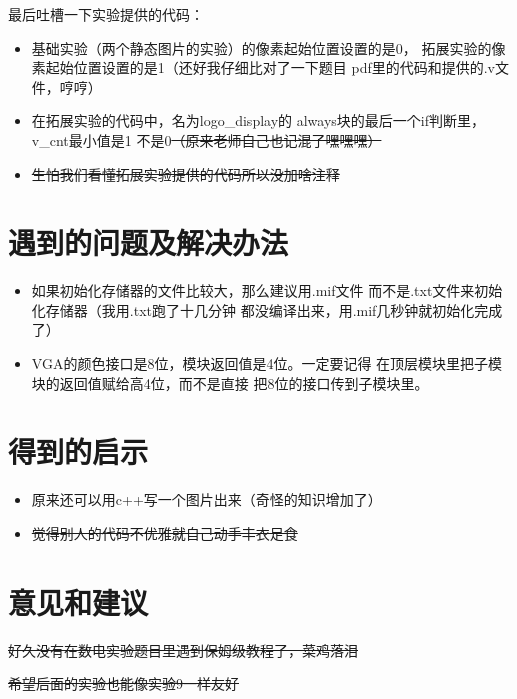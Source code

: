 \documentclass[12pt,a4paper,UTF8]{article}
\begin{document}
最后吐槽一下实验提供的代码：
\begin{itemize}
  \item 基础实验（两个静态图片的实验）的像素起始位置设置的是0，
        拓展实验的像素起始位置设置的是1（还好我仔细比对了一下题目
        pdf里的代码和提供的.v文件，哼哼）
  \item 在拓展实验的代码中，名为\mbox{logo\_display}的
        always块的最后一个if判断里，\mbox{v\_cnt}最小值是1
        不是0\sout{（原来老师自己也记混了嘿嘿嘿）}
  \item \sout{生怕我们看懂拓展实验提供的代码所以没加啥注释}
\end{itemize}


\section{遇到的问题及解决办法}
\begin{itemize}
  \item 如果初始化存储器的文件比较大，那么建议用.mif文件
        而不是.txt文件来初始化存储器（我用.txt跑了十几分钟
        都没编译出来，用.mif几秒钟就初始化完成了）
  \item VGA的颜色接口是8位，模块返回值是4位。一定要记得
        在顶层模块里把子模块的返回值赋给高4位，而不是直接
        把8位的接口传到子模块里。
\end{itemize}

\section{得到的启示}
\begin{itemize}
  \item 原来还可以用c++写一个图片出来（奇怪的知识增加了）
  \item \sout{觉得别人的代码不优雅就自己动手丰衣足食}
\end{itemize}

\section{意见和建议}

\sout{好久没有在数电实验题目里遇到保姆级教程了，菜鸡落泪}

\sout{希望后面的实验也能像实验9一样友好}
\end{document}
